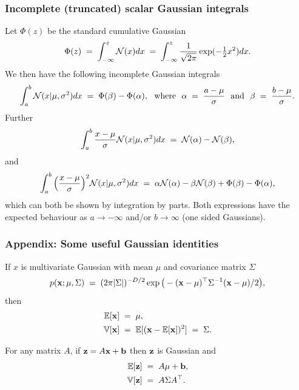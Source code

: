 \begin{frame}
\frametitle{Incomplete (truncated) scalar Gaussian integrals}

Let $\Phi(z)$ be the standard cumulative Gaussian
%
\[
\Phi(z)\;=\;\int_{-\infty}^z{\cal N}(x)dx\;=\;
\int_{-\infty}^z\frac{1}{\sqrt{2\pi}}
\exp(-\tfrac{1}{2}x^2)dx.
\]
%
We then have the following incomplete Gaussian integrals
%
\[
\int_a^b{\cal N}(x|\mu,\sigma^2)dx\;=\;\Phi(\beta)-\Phi(\alpha),
\text{\ \ where\ \ }
\alpha\;=\;\frac{a-\mu}{\sigma}\text{\ \ and\ \ }
\beta\;=\;\frac{b-\mu}{\sigma}.
\]
%
Further
%
\[
  \int_a^b\frac{x-\mu}{\sigma}{\cal N}(x|\mu,\sigma^2)dx\;=\;
  {\cal N}(\alpha)-{\cal N}(\beta),
\]
%
and
%
\[
 \int_a^b\Big(\frac{x-\mu}{\sigma}\Big)^2{\cal N}(x|\mu,\sigma^2)dx\;=\;
  \alpha{\cal N}(\alpha)-\beta{\cal
    N}(\beta)+\Phi(\beta)-\Phi(\alpha),
\]
%
which can both be shown by integration by parts. Both expressions have
the expected behaviour as $a\rightarrow-\infty$ and/or
$b\rightarrow\infty$ (one sided Gaussians).

\end{frame}


\begin{frame}

\frametitle{Appendix: Some useful Gaussian identities}
If $x$ is multivariate Gaussian with mean $\mu$ and
covariance matrix $\Sigma$
\[
p({\bf x}; \mu, \Sigma)\;=\;(2\pi|\Sigma|)^{-D/2}\exp\big(-({\bf
    x}-\mu)^\top\Sigma^{-1}({\bf x}-\mu)/2\big),
\]
then
\[
\begin{split}
\mathbb{E}[{\bf x}]\;&=\;\mu,\\
\mathbb{V}[{\bf x}]\;&=\;\mathbb{E}[({\bf x}-\mathbb{E}[{\bf x}])^2]\;=\;\Sigma.
\end{split}
\]

For any matrix $A$, if ${\bf z} = A{\bf x}+{\bf b}$ then ${\bf z}$ is Gaussian and
\[
\begin{split}
\mathbb{E}[{\bf z}] \;&=\; A\mu+{\bf b},\\
\mathbb{V}[{\bf z}] \;&=\;A\Sigma A^\top.
\end{split}
\]
\end{frame}

